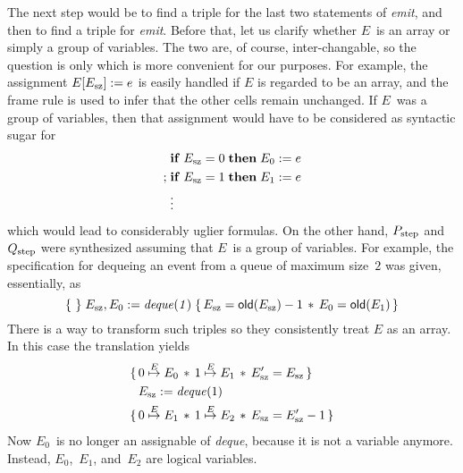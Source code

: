 \documentclass{article} %
\newcommand{\3}[3]{\{\,#1\,\}\;#2\;\{\,#3\,\}}
\newcommand{\eto}{\stackrel E\mapsto}
\renewcommand{\*}{\,*\,}
\begin{document}
The next step would be to find a triple for the last two statements of {\it emit}, and then to find a triple for {\it emit}.
Before that, let us clarify whether $E$~is an array or simply a group of variables.
The two are, of course, inter-changable, so the question is only which is more convenient for our purposes.
For example, the assignment $E[E_{\rm sz}]:=e$ is easily handled if $E$ is regarded to be an array, and the frame rule is used to infer that the other cells remain unchanged.
If $E$~was a group of variables, then that assignment would have to be considered as syntactic sugar for
\begin{align*}
      &{\bf if}\;E_{\rm sz}=0\;{\bf then}\;E_0:=e \\
  ;\; &{\bf if}\;E_{\rm sz}=1\;{\bf then}\;E_1:=e \\
      &\vdots
\end{align*}
which would lead to considerably uglier formulas.
On the other hand, $P_{\rm step}$ and~$Q_{\rm step}$ were synthesized assuming that $E$~is a group of variables.
For example, the specification for dequeing an event from a queue of maximum size~$2$ was given, essentially, as
\[ \3
  {}
  {E_{\rm sz},E_0:={\it deque(1)}}
  {E_{\rm sz}={\sf old}(E_{\rm sz})-1\*E_0={\sf old}(E_1)} \]
There is a way to transform such triples so they consistently treat $E$ as an array.
In this case the translation yields
\begin{align*}
  \{\,&0\eto E_0 \* 1\eto E_1 \* E'_{\rm sz}=E_{\rm sz} \,\} \\
  &E_{\rm sz}:={\it deque}(1) \\
  \{\,&0\eto E_1 \* 1\eto E_2 \* E_{\rm sz}=E'_{\rm sz}-1\,\}
\end{align*}
Now $E_0$~is no longer an assignable of {\it deque}, because it is not a variable anymore.
Instead, $E_0$,~$E_1$, and~$E_2$ are logical variables.
\end{document}
